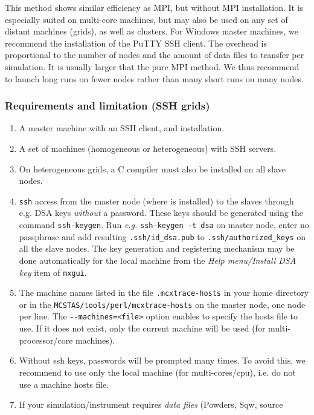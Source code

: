   This method shows similar efficiency as MPI, but without MPI installation. It is 
  especially suited on multi-core machines, but may also be used on any set of distant 
  machines (grids), as well as clusters. For Windows master machines,
  we recommend the installation of the PuTTY SSH client. The overhead is proportional to
  the number of nodes and the amount of data files to transfer per simulation. It is 
  usually larger that the pure MPI method. We thus recommend to launch long runs on fewer nodes
  rather than many short runs on many nodes.
  
\subsubsection{Requirements and limitation (SSH grids)}

  \begin{enumerate}
  \item{A master machine with an SSH client, and \MCX installation.}
  \item{A set of machines (homogeneous or heterogeneous) with SSH servers.}
  \item{On heterogeneous grids, a C compiler must also be installed on all slave nodes.}
  \item{\texttt{ssh} access from the master node (where \MCX is
      installed) to the slaves through e.g. DSA keys \emph{without} a
      password. These keys should be generated using the command
      \texttt{ssh-keygen}. Run \emph{e.g.} \texttt{ssh-keygen -t dsa} on
      master node, enter no passphrase and add resulting
      \texttt{.ssh/id\_dsa.pub} to \texttt{.ssh/authorized\_keys}
      on all the slave nodes. The key generation and registering mechanism 
      may be done automatically for the local machine from the 
      \emph{Help menu/Install DSA key} item of \verb+mxgui+.}
  \item{The machine names listed in the file \texttt{.mcxtrace-hosts} in
      your home directory or in the \texttt{MCSTAS/tools/perl/mcxtrace-hosts} on
      the master node, one node per line. The \verb'--machines=<file>' option
      enables to specify the hosts file to use. If it does not exist, only 
      the current machine will be used (for multi-processor/core machines).}
  \item{Without ssh keys, passwords will be prompted many times. To avoid this, 
      we recommend to use only the local machine (for multi-cores/cpu), i.e. do
      not use a machine hosts file.}
  \item{If your simulation/instrument requires \emph{data files} (Powders, Sqw, source 
}
\end{enumerate}
